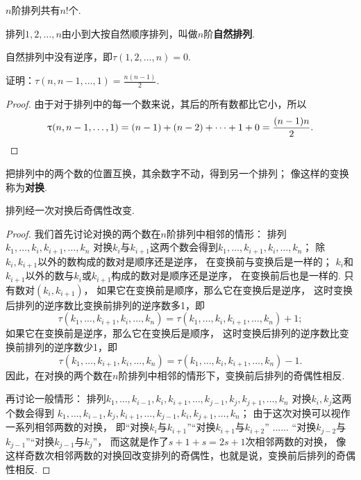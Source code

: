 \begin{property}
\(n\)阶排列共有\(n!\)个.
\end{property}

\begin{definition}
排列\(1,2,\dotsc,n\)由小到大按自然顺序排列，叫做\(n\)阶\textbf{自然排列}.
\end{definition}

\begin{property}
自然排列中没有逆序，即\(\tau(1,2,\dotsc,n)=0\).
\end{property}

\begin{example}
证明：\(\tau(n,n-1,\dotsc,1)=\frac{n(n-1)}{2}\).
\begin{proof}
由于对于排列中的每一个数来说，其后的所有数都比它小，所以\[
	\tau(n,n-1,\dotsc,1)
	= (n-1) + (n-2) + \dotsb + 1 + 0
	= \frac{(n-1)n}{2}.
	\qedhere
\]
\end{proof}
\end{example}

\begin{definition}
把排列中的两个数的位置互换，其余数字不动，得到另一个排列；
像这样的变换称为\textbf{对换}.
\end{definition}

\begin{theorem}
排列经一次对换后奇偶性改变.
\begin{proof}
我们首先讨论对换的两个数在\(n\)阶排列中相邻的情形：
排列\(k_1,\dotsc,k_i,k_{i+1},\dotsc,k_n\)
对换\(k_i\)与\(k_{i+1}\)这两个数会得到\(k_1,\dotsc,k_{i+1},k_i,\dotsc,k_n\)；
除\(k_i,k_{i+1}\)以外的数构成的数对是顺序还是逆序，
在变换前与变换后是一样的；
\(k_i\)和\(k_{i+1}\)以外的数与\(k_i\)或\(k_{i+1}\)构成的数对是顺序还是逆序，
在变换前后也是一样的.
只有数对\((k_i,k_{i+1})\)，
如果它在变换前是顺序，那么它在变换后是逆序，
这时变换后排列的逆序数比变换前排列的逆序数多1，即\[
	\tau(k_1,\dotsc,k_{i+1},k_i,\dotsc,k_n)
	= \tau(k_1,\dotsc,k_i,k_{i+1},\dotsc,k_n) + 1;
\]
如果它在变换前是逆序，那么它在变换后是顺序，
这时变换后排列的逆序数比变换前排列的逆序数少1，即\[
	\tau(k_1,\dotsc,k_{i+1},k_i,\dotsc,k_n)
	= \tau(k_1,\dotsc,k_i,k_{i+1},\dotsc,k_n) - 1.
\]
因此，在对换的两个数在\(n\)阶排列中相邻的情形下，变换前后排列的奇偶性相反.

再讨论一般情形：
排列\(k_1,\dotsc,k_{i-1},k_i,k_{i+1},\dotsc,k_{j-1},k_j,k_{j+1},\dotsc,k_n\)
对换\(k_i,k_j\)这两个数会得到
\(k_1,\dotsc,k_{i-1},k_j,k_{i+1},\dotsc,k_{j-1},k_i,k_{j+1},\dotsc,k_n\)；
由于这次对换可以视作一系列相邻两数的对换，
即“对换\(k_i\)与\(k_{i+1}\)”“对换\(k_{i+1}\)与\(k_{i+2}\)”%
......%
“对换\(k_{j-2}\)与\(k_{j-1}\)”“对换\(k_{j-1}\)与\(k_j\)”，
而这就是作了\(s+1+s=2s+1\)次相邻两数的对换，
像这样奇数次相邻两数的对换回改变排列的奇偶性，也就是说，变换前后排列的奇偶性相反.
\end{proof}
\end{theorem}

